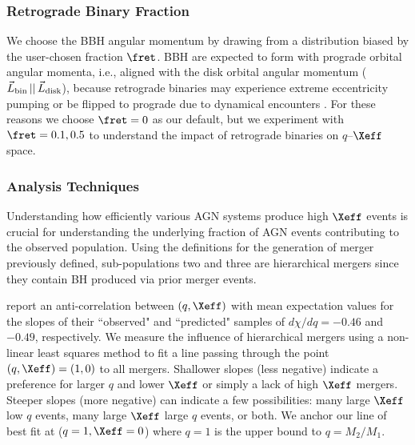 \subsubsection{Retrograde Binary Fraction}
We choose the BBH angular momentum by drawing from a distribution biased by the user-chosen fraction $\fret$.
BBH  are expected to form with prograde orbital angular momenta, i.e., aligned with the disk orbital angular momentum ($\vec{L}_{\rm bin}\,||\,\vec{L}_{\rm disk}$), because retrograde binaries may experience extreme eccentricity pumping \citep{Wang+21} or be flipped to prograde due to dynamical encounters \citep{Samsing+22,McKernanFord24}.
For these reasons we choose $\fret=0$ as our default, but we  experiment with $\fret=0.1, 0.5$ to understand the impact of retrograde binaries on $q$--$\Xeff$ space.



\subsubsection{Analysis Techniques}
Understanding how efficiently various AGN systems produce high $\Xeff$ events is crucial for understanding the underlying fraction of AGN events contributing to the observed population.
Using the definitions for the generation of merger previously defined, sub-populations two and three are hierarchical mergers since they contain BH produced via prior merger events.

\citet{Callister+21} report an anti-correlation between $(q,\Xeff)$ with mean expectation values for the slopes of their ``observed" and ``predicted" samples of $d\chi/dq = -0.46$ and $-0.49$, respectively.
We measure the influence of hierarchical mergers using a non-linear least squares method to fit a line passing through the point $(q,\Xeff)=(1,0)$ to all mergers.
Shallower slopes (less negative) indicate a preference for larger $q$ and lower $\Xeff$ or simply a lack of high $\Xeff$ mergers.
Steeper slopes (more negative) can indicate a few possibilities: many large $\Xeff$ low $q$ events, many large $\Xeff$ large $q$ events, or both.
We anchor our line of best fit at ($q=1,\Xeff=0$) where $q=1$ is the upper bound to $q=M_{2}/M_{1}$.

